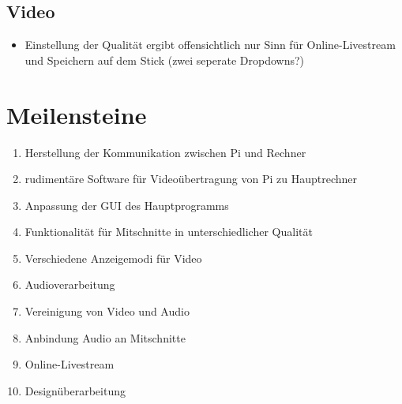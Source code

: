 \documentclass[10pt,a4paper,notitlepage]{article}
\begin{document}
\subsection{Video}
\begin{itemize}
\item Einstellung der Qualität ergibt offensichtlich nur Sinn für Online-Livestream und Speichern auf dem Stick (zwei seperate Dropdowns?)
\end{itemize}
\section{Meilensteine}
\begin{enumerate}
\item Herstellung der Kommunikation zwischen Pi und Rechner
\item rudimentäre Software für Videoübertragung von Pi zu Hauptrechner
\item Anpassung der GUI des Hauptprogramms 
\item Funktionalität für Mitschnitte in unterschiedlicher Qualität
\item Verschiedene Anzeigemodi für Video
\item Audioverarbeitung
\item Vereinigung von Video und Audio
\item Anbindung Audio an Mitschnitte
\item Online-Livestream
\item Designüberarbeitung
\end{enumerate}
\end{document}
